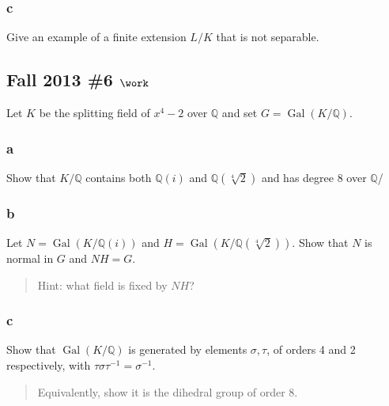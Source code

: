 \hypertarget{c-45}{%
\subsubsection{c}\label{c-45}}

Give an example of a finite extension \(L/K\) that is not separable.

\hypertarget{fall-2013-6-work}{%
\subsection{\texorpdfstring{Fall 2013 \#6
\(\work\)}{Fall 2013 \#6 \textbackslash work}}\label{fall-2013-6-work}}

Let \(K\) be the splitting field of \(x^4-2\) over \({\mathbb{Q}}\) and
set \(G = \operatorname{Gal}(K/{\mathbb{Q}})\).

\hypertarget{a-79}{%
\subsubsection{a}\label{a-79}}

Show that \(K/{\mathbb{Q}}\) contains both \({\mathbb{Q}}(i)\) and
\({\mathbb{Q}}(\sqrt[4]{2})\) and has degree 8 over \({\mathbb{Q}}\)/

\hypertarget{b-69}{%
\subsubsection{b}\label{b-69}}

Let \(N = \operatorname{Gal}(K/{\mathbb{Q}}(i))\) and
\(H = \operatorname{Gal}(K/{\mathbb{Q}}(\sqrt[4]{2}))\). Show that \(N\)
is normal in \(G\) and \(NH = G\).

\begin{quote}
Hint: what field is fixed by \(NH\)?
\end{quote}

\hypertarget{c-46}{%
\subsubsection{c}\label{c-46}}

Show that \(\operatorname{Gal}(K/{\mathbb{Q}})\) is generated by
elements \(\sigma, \tau\), of orders 4 and 2 respectively, with
\(\tau \sigma\tau^{-1}= \sigma^{-1}\).

\begin{quote}
Equivalently, show it is the dihedral group of order 8.
\end{quote}

